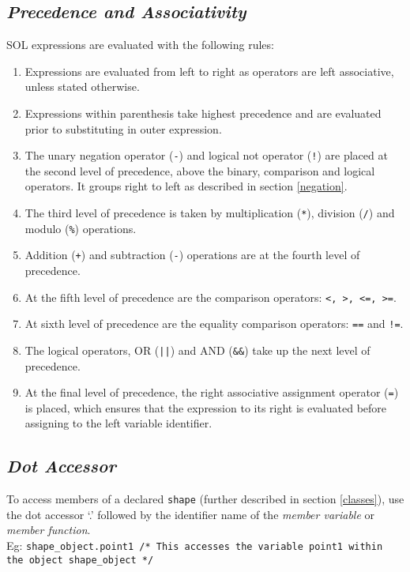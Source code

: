     \subsection{\textit{Precedence and Associativity}} \label{precedence}
    SOL expressions are evaluated with the following rules:
    \begin{enumerate}
        \itemsep0em
        \item Expressions are evaluated from left to right as operators are left associative, unless stated otherwise.

        \item Expressions within parenthesis take highest precedence and are evaluated prior to substituting in outer expression.
        
        \item The unary negation operator (\texttt{-}) and logical not operator (\texttt{!}) are placed at the second level of precedence, above the binary, comparison and logical operators. It groups right to left as described in section \ref{negation}.
        
        \item The third level of precedence is taken by multiplication (\texttt{*}), division (\texttt{/}) and modulo (\texttt{\%}) operations.
        
        \item Addition (\texttt{+}) and subtraction (\texttt{-}) operations are at the fourth level of precedence.
        
        \item At the fifth level of precedence are the comparison operators: \texttt{\textless, \textgreater, \textless=, \textgreater=}.

        \item At sixth level of precedence are the equality comparison operators: \texttt{==} and \texttt{!=}.

        \item The logical operators, OR (\texttt{||}) and AND (\texttt{\&\&}) take up the next level of precedence.

        \item At the final level of precedence, the right associative assignment operator (\texttt{=}) is placed, which ensures that the expression to its right is evaluated before assigning to the left variable identifier.

    \end{enumerate}
    
    \subsection{\textit{Dot Accessor}}
    To access members of a declared \texttt{shape} (further described in section \ref{classes}), use the dot accessor `.' followed by the identifier name of the \textit{member variable} or \textit{member function}. \\
    Eg: \texttt{shape\_object.point1 /* This accesses the variable point1 within the object shape\_object */}


